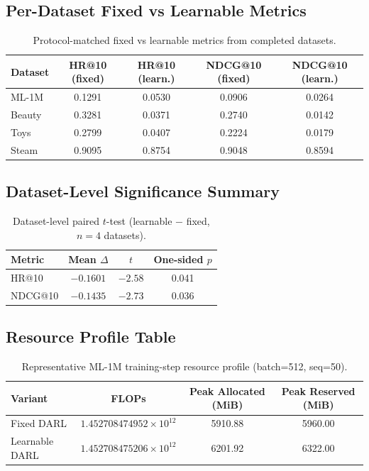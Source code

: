 \documentclass[11pt]{article}
\begin{document}
\subsection{Per-Dataset Fixed vs Learnable Metrics}
\begin{table}[h]
\centering
\caption{Protocol-matched fixed vs learnable metrics from completed datasets.}
\begin{tabular}{lcccc}
\toprule
Dataset & HR@10 (fixed) & HR@10 (learn.) & NDCG@10 (fixed) & NDCG@10 (learn.) \\
\midrule
ML-1M   & 0.1291 & 0.0530 & 0.0906 & 0.0264 \\
Beauty  & 0.3281 & 0.0371 & 0.2740 & 0.0142 \\
Toys    & 0.2799 & 0.0407 & 0.2224 & 0.0179 \\
Steam   & 0.9095 & 0.8754 & 0.9048 & 0.8594 \\
\bottomrule
\end{tabular}
\end{table}

\subsection{Dataset-Level Significance Summary}
\begin{table}[h]
\centering
\caption{Dataset-level paired $t$-test (learnable $-$ fixed, $n=4$ datasets).}
\begin{tabular}{lccc}
\toprule
Metric & Mean $\Delta$ & $t$ & One-sided $p$ \\
\midrule
HR@10   & $-0.1601$ & $-2.58$ & 0.041 \\
NDCG@10 & $-0.1435$ & $-2.73$ & 0.036 \\
\bottomrule
\end{tabular}
\end{table}

\subsection{Resource Profile Table}
\begin{table}[h]
\centering
\caption{Representative ML-1M training-step resource profile (batch=512, seq=50).}
\begin{tabular}{lccc}
\toprule
Variant & FLOPs & Peak Allocated (MiB) & Peak Reserved (MiB) \\
\midrule
Fixed DARL      & $1.452708474952\times10^{12}$ & 5910.88 & 5960.00 \\
Learnable DARL  & $1.452708475206\times10^{12}$ & 6201.92 & 6322.00 \\
\bottomrule
\end{tabular}
\end{table}
\end{document}
